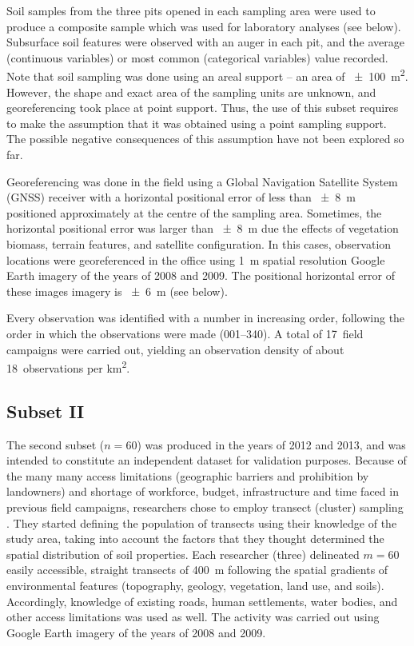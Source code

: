 Soil samples from the three pits opened in each sampling area were used to produce a composite sample
which was used for laboratory analyses (see below). Subsurface soil features were observed with an auger 
in each pit, and the average (continuous variables) or most common (categorical variables) value recorded.
Note that soil sampling was done using an areal support -- an area of \SI{\pm100}{\metre\squared}. However, 
the shape and exact area of the sampling units are unknown, and georeferencing took place at point 
support. Thus, the use of this subset requires to make the assumption that it was obtained using a point
sampling support. The possible negative consequences of this assumption have not been explored so far.

Georeferencing was done in the field using a Global Navigation Satellite System (GNSS) receiver with a 
horizontal positional error of less than \SI{\pm8}{\metre} positioned approximately at the centre of the
sampling area. Sometimes, the horizontal positional error was larger than \SI{\pm8}{\metre} due the effects
of vegetation biomass, terrain features, and satellite configuration. In this cases, observation locations 
were georeferenced in the office using \SI{1}{\metre} spatial resolution Google Earth\textregistered{} 
imagery of the years of 2008 and 2009. The positional horizontal error of these images imagery is 
\SI{\pm6}{\metre} (see below).

Every observation was identified with a number in increasing order, following the order in which 
the observations were made (\num{001}--\num{340}). A total of \num{17}~field campaigns were carried out,
yielding an observation density of about \num{18}~observations per \si{\kilo\metre\squared}.

\tocless\subsection{Subset II}

The second subset ($n = 60$) was produced in the years of \num{2012} and \num{2013}, and was intended to 
constitute an independent dataset for validation purposes. Because of the many many access limitations 
(geographic barriers and prohibition by landowners) and shortage of workforce, budget, infrastructure and 
time faced in previous field campaigns, researchers chose to employ transect (cluster) sampling 
\cite{MiguelEtAl2012,Moura-BuenoEtAl2012,Samuel-RosaEtAl2013}. They started defining the population of 
transects using their knowledge of the study area, taking into account the factors that they thought 
determined the spatial distribution of soil properties. Each researcher (three) delineated $m = 60$ easily 
accessible, straight transects of \SI{400}{\metre} following the spatial gradients of environmental features 
(topography, geology, vegetation, land use, and soils). Accordingly, knowledge of existing roads, human 
settlements, water bodies, and other access limitations was used as well. The activity was carried out using 
Google Earth\textregistered{} imagery of the years of \num{2008} and \num{2009}.

